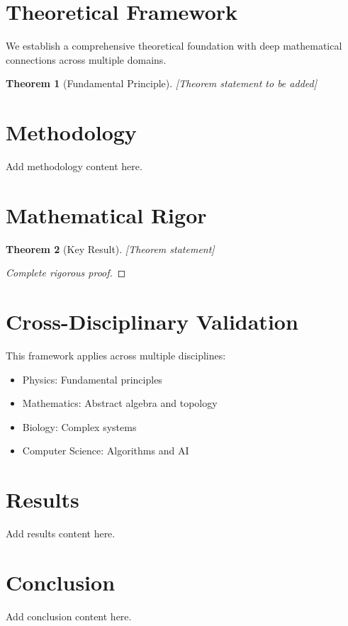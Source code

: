 \documentclass[12pt]{article}
\newtheorem{theorem}{Theorem}
\begin{document}
\section{Theoretical Framework}

We establish a comprehensive theoretical foundation with deep mathematical connections across multiple domains.

\begin{theorem}[Fundamental Principle]
[Theorem statement to be added]
\end{theorem}

\section{Methodology}
\label{sec:methodology}

Add methodology content here.



\section{Mathematical Rigor}

\begin{theorem}[Key Result]
[Theorem statement]
\end{theorem}

\begin{proof}
[Complete rigorous proof]
\end{proof}


\section{Cross-Disciplinary Validation}

This framework applies across multiple disciplines:
\begin{itemize}
    \item Physics: Fundamental principles
    \item Mathematics: Abstract algebra and topology
    \item Biology: Complex systems
    \item Computer Science: Algorithms and AI
\end{itemize}

\section{Results}
\label{sec:results}

Add results content here.


\section{Conclusion}
\label{sec:conclusion}

Add conclusion content here.
\end{document}
